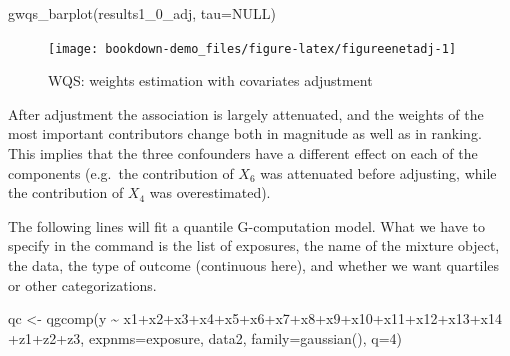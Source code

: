 \documentclass[
]{book}
\newenvironment{Shaded}{\begin{snugshade}}{\end{snugshade}}
\newcommand{\AttributeTok}[1]{\textcolor[rgb]{0.77,0.63,0.00}{#1}}
\newcommand{\ConstantTok}[1]{\textcolor[rgb]{0.00,0.00,0.00}{#1}}
\newcommand{\DecValTok}[1]{\textcolor[rgb]{0.00,0.00,0.81}{#1}}
\newcommand{\FunctionTok}[1]{\textcolor[rgb]{0.00,0.00,0.00}{#1}}
\newcommand{\NormalTok}[1]{#1}
\newcommand{\OtherTok}[1]{\textcolor[rgb]{0.56,0.35,0.01}{#1}}
\newcommand{\SpecialCharTok}[1]{\textcolor[rgb]{0.00,0.00,0.00}{#1}}
\begin{document}
\begin{Shaded}
\begin{Highlighting}[]
\FunctionTok{gwqs\_barplot}\NormalTok{(results1\_0\_adj, }\AttributeTok{tau=}\ConstantTok{NULL}\NormalTok{)}
\end{Highlighting}
\end{Shaded}

\begin{figure}[H]

{\centering \texttt{[image: bookdown-demo\_files/figure-latex/figureenetadj-1]} 

}

\caption{WQS: weights estimation with covariates adjustment}\label{fig:figureenetadj}
\end{figure}

After adjustment the association is largely attenuated, and the weights of the most important contributors change both in magnitude as well as in ranking. This implies that the three confounders have a different effect on each of the components (e.g.~the contribution of \(X_6\) was attenuated before adjusting, while the contribution of \(X_4\) was overestimated).

The following lines will fit a quantile G-computation model. What we have to specify in the command is the list of exposures, the name of the mixture object, the data, the type of outcome (continuous here), and whether we want quartiles or other categorizations.

\begin{Shaded}
\begin{Highlighting}[]
\NormalTok{qc }\OtherTok{\textless{}{-}} \FunctionTok{qgcomp}\NormalTok{(y }\SpecialCharTok{\textasciitilde{}}\NormalTok{ x1}\SpecialCharTok{+}\NormalTok{x2}\SpecialCharTok{+}\NormalTok{x3}\SpecialCharTok{+}\NormalTok{x4}\SpecialCharTok{+}\NormalTok{x5}\SpecialCharTok{+}\NormalTok{x6}\SpecialCharTok{+}\NormalTok{x7}\SpecialCharTok{+}\NormalTok{x8}\SpecialCharTok{+}\NormalTok{x9}\SpecialCharTok{+}\NormalTok{x10}\SpecialCharTok{+}\NormalTok{x11}\SpecialCharTok{+}\NormalTok{x12}\SpecialCharTok{+}\NormalTok{x13}\SpecialCharTok{+}\NormalTok{x14}
                         \SpecialCharTok{+}\NormalTok{z1}\SpecialCharTok{+}\NormalTok{z2}\SpecialCharTok{+}\NormalTok{z3,}
                         \AttributeTok{expnms=}\NormalTok{exposure,}
\NormalTok{                         data2, }\AttributeTok{family=}\FunctionTok{gaussian}\NormalTok{(), }\AttributeTok{q=}\DecValTok{4}\NormalTok{)}
\end{Highlighting}
\end{Shaded}
\end{document}
